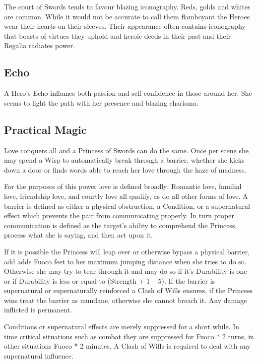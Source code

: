 The court of Swords tends to favour blazing iconography. Reds, golds and whites are common. While it would not be accurate to call them flamboyant the Heroes wear their hearts on their sleeves. Their appearance often contains iconography that boasts of virtues they uphold and heroic deeds in their past and their Regalia radiates power. 

\subsection*{Echo}

A Hero's Echo inflames both passion and self confidence in those around her. She seems to light the path with her presence and blazing charisma. 

\subsection*{Practical Magic}

Love conquers all and a Princess of Swords can do the same. Once per scene she may spend a Wisp to automatically break through a barrier, whether she kicks down a door or finds words able to reach her love through the haze of madness.

For the purposes of this power love is defined broadly: Romantic love, familial love, friendship love, and courtly love all qualify, as do all other forms of love. A barrier is defined as either a physical obstruction, a Condition, or a supernatural effect which prevents the pair from communicating properly. In turn proper communication is defined as the target's ability to comprehend the Princess, process what she is saying, and then act upon it.

If it is possible the Princess will leap over or otherwise bypass a physical barrier, add adds Fuoco feet to her maximum jumping distance when she tries to do so. Otherwise she may try to tear through it and may do so if it's Durability is one or if Durability is less or equal to (Strength + 1 – 5). If the barrier is supernatural or supernaturally reinforced a Clash of Wills ensures, if the Princess wins treat the barrier as mundane, otherwise she cannot breach it. Any damage inflicted is permanent.

Conditions or supernatural effects are merely suppressed for a short while. In time critical situations such as combat they are suppressed for Fuoco * 2 turns, in other situations Fuoco * 2 minutes. A Clash of Wills is required to deal with any supernatural influence.

